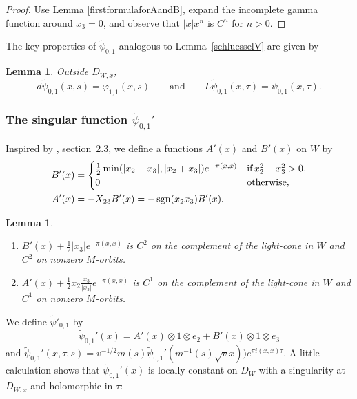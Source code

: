 \documentclass[12pt,leqno]{amsart}
\numberwithin{equation}{section}
\theoremstyle{plain}
\newtheorem{lemma}[theorem]{Lemma}
\theoremstyle{definition}
\theoremstyle{remark}
\newcommand{\sgn}{\operatorname{sgn}}
\begin{document}
\begin{proof} 
Use Lemma \ref{firstformulaforAandB},
expand the incomplete gamma function around $x_3=0$,
and observe that $|x|x^n$ is $C^n$ for $n>0$. 
\end{proof}





The key properties of $\tilde{\psi}_{0,1}$ analogous to Lemma~\ref{schluesselV} are given by 

\begin{lemma}\label{schluessel}
Outside $D_{W,x}$,
\[
d\tilde{\psi}_{0,1}(x,s) = \varphi_{1,1}(x,s) \qquad \text{and} \qquad 
L\tilde{\psi}_{0,1}(x,\tau) = \psi_{0,1}(x,\tau).
\]
\end{lemma}



\subsubsection{The singular function $\tilde{\psi}_{0,1}'$}



Inspired by \cite{HZ}, section~2.3, we define a functions $A'(x)$ and $B'(x)$ on $W$ by
\begin{align}\label{AB'-eq}
B'(x) &= \begin{cases} \frac12\min(|x_2-x_3|,|x_2+ x_3|)e^{- \pi (x,x)}  & \text{if}  \, x_2^2-x_3^2 >0,\\ 0 \  & \text{otherwise},
\end{cases} \\
A'(x) &= -X_{23}B'(x)=   -\sgn(x_2x_3)B'(x). \notag
\end{align}
 
 \begin{lemma}\label{singularitiesofA'andB'} 
\begin{enumerate}
\item[(i)] 
$B'(x) + \tfrac12|x_3|e^{- \pi (x,x)}$ is $C^2$ on the complement of the light-cone in $W$ and  $C^2$ on nonzero $M$-orbits.
 \item[(ii)] 
 $A'(x) + \tfrac12 x_2 \frac{x_3}{|x_3|}e^{- \pi (x,x)}$ is $C^1$ on the complement of the light-cone in $W$ and  $C^1$  on nonzero $M$-orbits.
 \end{enumerate}
\end{lemma}





We define $\tilde{\psi}'_{0,1}$ by
\[
\tilde{\psi}_{0,1}'(x) = A'(x) \otimes 1 \otimes e_2 +  B'(x) \otimes 1 \otimes e_3
\]
and $\tilde{\psi}_{0,1}'(x,\tau,s) = v^{-1/2} m(s) \tilde{\psi}_{0,1}'(m^{-1}(s)\sqrt{v}x)) e^{\pi i (x,x)\tau}$. A little calculation shows that $\tilde{\psi}_{0,1}'(x)$ is locally constant on $D_W$ with a singularity at $D_{W,x}$ and holomorphic in $\tau$:
\end{document}
